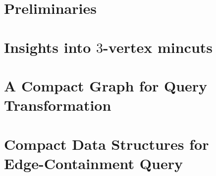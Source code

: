 \documentclass[letterpaper,11pt]{article}
\begin{document}
\section{Preliminaries} \label{sec:prelimiaries}


\section{Insights into \texorpdfstring{$3$}{3}-vertex mincuts} \label{sec:query-transformation}



\vspace{-6mm}
\section{A Compact Graph for Query Transformation}
\vspace{-2mm}

\vspace{-3mm}
\section{Compact Data Structures for Edge-Containment Query} \label{sec:final-ds}
\vspace{-2mm}




\pagebreak




% 

\pagebreak
\appendix


\end{document}
